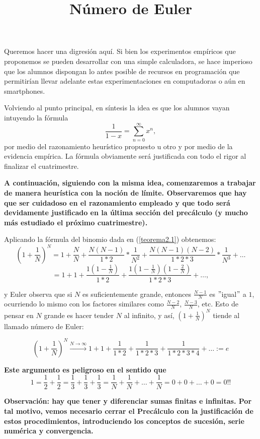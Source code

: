 \documentclass[a4paper,10pt,BCOR10mm,oneside,headsepline]{scrbook}
\begin{document}
\begin{itemize}
 Queremos hacer una digresión aquí. Si bien los experimentos empíricos que proponemos se pueden desarrollar con una simple calculadora, 
 se hace imperioso que  los alumnos dispongan lo antes posible de  recursos en  programación que permitirían  llevar adelante estas experimentaciones en computadoras o aún en smartphones. 
 
Volviendo al punto principal, en síntesis la idea es que los alumnos vayan intuyendo la fórmula
 \[\frac{1}{1-x}=\sum_{n=0}^{\infty}x^n,\]
 por medio del razonamiento heurístico propuesto u otro y por medio de la evidencia empírica. La fórmula obviamente será justificada con todo el rigor al finalizar el cuatrimestre.  
\end{itemize}

\textbf{A continuación, siguiendo con la misma idea, comenzaremos a trabajar de manera heurística con la noción de límite. Observaremos que hay que ser cuidadoso en el razonamiento empleado y que todo será devidamente justificado en la última sección del precálculo (y mucho más estudiado el próximo cuatrimestre).}

\title{Número de Euler}
 Aplicando la fórmula del binomio dada en (\ref{teorema2.1}) obtenemos:
\[(1+\frac{1}{N})^N=1+\frac{N}{N}+\frac{N(N-1)}{1*2}*\frac{1}{N^2}+\frac{N(N-1)(N-2)}{1*2*3}*\frac{1}{N^3}+\dots\] \[=1+1+\frac{1(1-\frac{1}{N})}{1*2}+\frac{1(1-\frac{1}{N})(1-\frac{2}{N})}{1*2*3}+\dots, \]

y Euler observa que si $N$ es suficientemente grande, entonces $\frac{N-1}{N}$ es $"$igual$"$ a $1$, ocurriendo lo mismo con los factores similares como $\frac{N-2}{N}$, $\frac{N-3}{N}$, etc. Esto de pensar en $N$ grande es hacer tender $N$ al infinito, y así, $(1+\frac{1}{N})^N$ tiende al llamado número de Euler:

\begin{equation}\label{2.17}
(1+\frac{1}{N})^N \stackrel{N \rightarrow \infty}{\longrightarrow} 1+1+\frac{1}{1*2}+\frac{1}{1*2*3}+\frac{1}{1*2*3*4}+\dots :=e
\end{equation}

\textbf{Este argumento es peligroso en el sentido que}
\[1=\frac{1}{2}+\frac{1}{2}=\frac{1}{3}+\frac{1}{3}+\frac{1}{3}=\frac{1}{N}+\frac{1}{N}+\dots+\frac{1}{N}=0+0+\dots+0=0!!\]

\textbf{Observación: hay que tener y diferenciar sumas finitas e infinitas. Por tal motivo, vemos necesario cerrar el Precálculo con la justificación de estos procedimientos, introduciendo los conceptos de sucesión, serie numérica y convergencia.}
\end{document}
